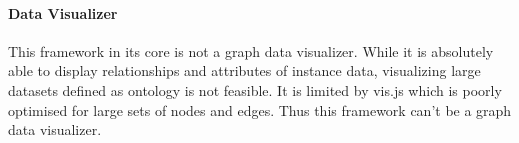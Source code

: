 \paragraph{Data Visualizer}
This framework in its core is not a graph data visualizer. While it is absolutely able to display relationships and attributes of instance data, visualizing 
large datasets defined as ontology is not feasible. It is limited by vis.js which is poorly optimised for large sets of nodes and edges. 
Thus this framework can't be a graph data visualizer. 